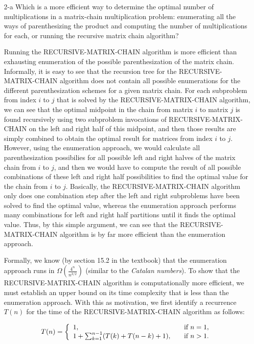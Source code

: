 \documentclass[11pt]{article}
\begin{document}
\begin{prob}{2-a}
Which is a more efficient way to determine the optimal number of multiplications in a matrix-chain multiplication problem: enumerating all the ways of parenthesizing the product and computing the number of multiplications for each, or running the recursive matrix chain algorithm?
\end{prob}
\begin{sol}
Running the RECURSIVE-MATRIX-CHAIN algorithm is more efficient than exhausting enumeration of the possible parenthesization of the matrix chain. Informally, it is easy to see that the recursion tree for the RECURSIVE-MATRIX-CHAIN algorithm does not contain all possible enumerations for the different parenthesization schemes for a given matrix chain. For each subproblem from index $i$ to $j$ that is solved by the RECURSIVE-MATRIX-CHAIN algorithm, we can see that the optimal midpoint in the chain from matrix $i$ to matrix $j$ is found recursively using two subproblem invocations of RECURSIVE-MATRIX-CHAIN on the left and right half of this midpoint, and then those results are simply combined to obtain the optimal result for matrices from index $i$ to $j$. However, using the enumeration approach, we would calculate all  parenthesization possibilies for all possible left and right halves of the matrix chain from $i$ to $j$, and then we would have to compute the result of all possible combinations of these left and right half possibilities to find the optimal value for the chain from $i$ to $j$. Basically, the RECURSIVE-MATRIX-CHAIN  algorithm only does one combination step after the left and right subproblems have been solved to find the optimal value, whereas the enumeration approach performs many combinations for left and right half partitions until it finds the optimal value. Thus, by this simple argument, we can see that the RECURSIVE-MATRIX-CHAIN algorithm is by far more efficient than the enumeration approach.

Formally, we know (by section 15.2 in the textbook) that the enumeration approach runs in $\Omega(\frac{4^n}{n^{3/2}})$ (similar to the \emph{Catalan numbers}). To show that the RECURSIVE-MATRIX-CHAIN algorithm is computationally more efficient, we must establish an upper bound on its time complexity that is less than the enumeration approach. With this as motivation, we first identify a recurrence $T(n)$ for the time of the RECURSIVE-MATRIX-CHAIN algorithm as follows:

\[
T(n) = \left\{ 
  \begin{array}{l l}
    1, & \quad \text{if $n = 1$}, \\
    1 + \sum_{k=1}^{n-1}(T(k) + T(n-k) + 1), & \quad \text{if $n > 1$}. \\
  \end{array} \right.
\]


\end{sol}
\end{document}
